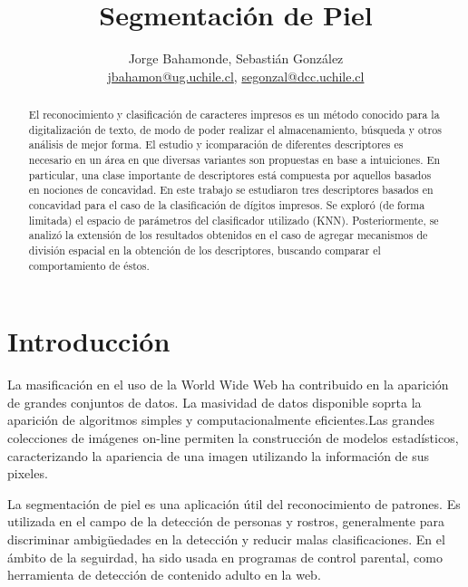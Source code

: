 \documentclass[12pt]{article}
\title{Segmentación de Piel}
\author{Jorge Bahamonde, Sebastián González\\
\small{\url{jbahamon@ug.uchile.cl}, \url{segonzal@dcc.uchile.cl}}}
\date{}
\begin{document}
\maketitle

\begin{abstract}
    El reconocimiento y clasificación de caracteres impresos es un método
    conocido para la digitalización de texto, de modo de poder realizar el
    almacenamiento, búsqueda y otros análisis de mejor forma.  El estudio y
    icomparación de diferentes descriptores es necesario en un área en que
    diversas variantes son propuestas en base a intuiciones. En particular, una
    clase importante de descriptores está compuesta por aquellos basados en
    nociones de concavidad. En este trabajo se estudiaron tres descriptores
    basados en concavidad para el caso de la clasificación de dígitos impresos.
    Se exploró (de forma limitada) el espacio de parámetros del clasificador
    utilizado (KNN). Posteriormente, se analizó la extensión de los resultados
    obtenidos en el caso de agregar mecanismos de división espacial en la
    obtención de los descriptores, buscando comparar el comportamiento de éstos.
\end{abstract}

\section{Introducción}


La masificación en el uso de la World Wide Web ha contribuido en la aparición de
grandes conjuntos de datos. La masividad de datos disponible soprta la aparición de
algoritmos simples y computacionalmente eficientes.Las grandes colecciones de imágenes on-line permiten
la construcción de modelos estadísticos, caracterizando la apariencia de una imagen utilizando
la información de sus pixeles.

La segmentación de piel es una aplicación útil del reconocimiento de patrones. Es utilizada en el campo de la detección de personas y rostros, generalmente
para discriminar ambigüedades en la detección y reducir malas clasificaciones. En el ámbito de la seguirdad, ha sido usada en programas de control parental, como herramienta de detección de contenido adulto en la web.
\end{document}
